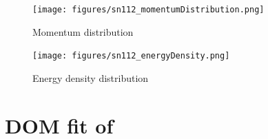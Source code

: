 \begin{figure}[H]
    \centering
    \texttt{[image: figures/sn112\_momentumDistribution.png]}
    \caption{Momentum distribution}
    \label{DOMFitData_sn112_momentumDistribution}
\end{figure}

\begin{figure}[H]
    \centering
    \texttt{[image: figures/sn112\_energyDensity.png]}
    \caption{Energy density distribution}
    \label{DOMFitData_sn112_energyDensity}
\end{figure}

\section{DOM fit of \snFour}

\label{sn124DOMOutput}
